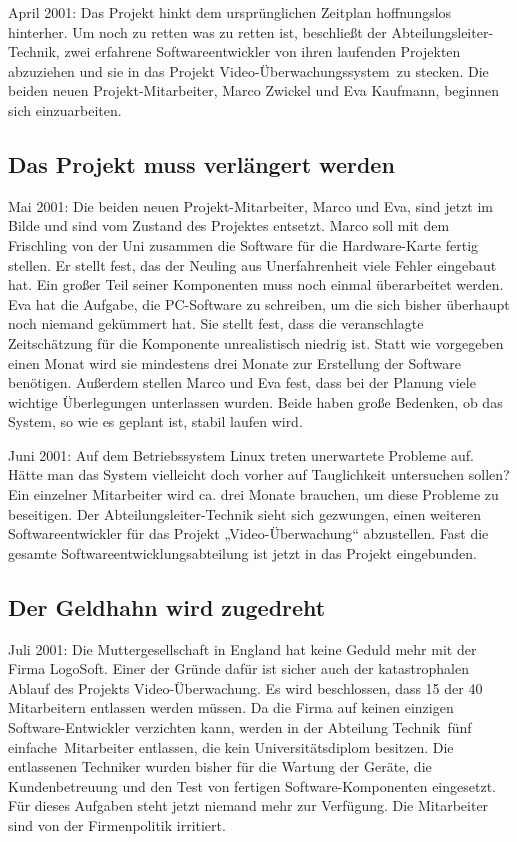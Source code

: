 April 2001: Das Projekt hinkt dem ursprünglichen Zeitplan hoffnungslos
hinterher. Um noch zu retten was zu retten ist, beschließt der
Abteilungsleiter-Technik, zwei erfahrene Softwareentwickler von ihren laufenden
Projekten abzuziehen und sie in das Projekt \glqq Video-Überwachungssystem\grqq\
zu stecken. Die beiden neuen Projekt-Mitarbeiter, Marco Zwickel und Eva
Kaufmann, beginnen sich einzuarbeiten.


\subsection{Das Projekt muss verlängert werden}

Mai 2001: Die beiden neuen Projekt-Mitarbeiter, Marco und Eva, sind jetzt im
Bilde und sind vom Zustand des Projektes entsetzt. Marco soll mit dem
Frischling von der Uni zusammen die Software für die Hardware-Karte fertig
stellen. Er stellt fest, das der Neuling aus Unerfahrenheit viele Fehler
eingebaut hat. Ein großer Teil seiner Komponenten muss noch einmal überarbeitet
werden. Eva hat die Aufgabe, die PC-Software zu schreiben, um die sich bisher
überhaupt noch niemand gekümmert hat. Sie stellt fest, dass die veranschlagte
Zeitschätzung für die Komponente unrealistisch niedrig ist. Statt wie
vorgegeben einen Monat wird sie mindestens drei Monate zur Erstellung der
Software benötigen. Außerdem stellen Marco und Eva fest, dass bei der Planung
viele wichtige Überlegungen unterlassen wurden. Beide haben große Bedenken, ob
das System, so wie es geplant ist, stabil laufen wird.

Juni 2001: Auf dem Betriebssystem Linux treten unerwartete Probleme auf. Hätte
man das System vielleicht doch vorher auf Tauglichkeit untersuchen sollen? Ein
einzelner Mitarbeiter wird ca. drei Monate brauchen, um diese Probleme zu
beseitigen. Der Abteilungsleiter-Technik sieht sich gezwungen, einen weiteren
Softwareentwickler für das Projekt „Video-Überwachung“ abzustellen. Fast die
gesamte Softwareentwicklungsabteilung ist jetzt in das Projekt eingebunden.


\subsection{Der Geldhahn wird zugedreht}

Juli 2001: Die Muttergesellschaft in England hat keine Geduld mehr mit der
Firma LogoSoft. Einer der Gründe dafür ist sicher auch der katastrophalen
Ablauf des Projekts Video-Überwachung. Es wird beschlossen, dass 15 der 40
Mitarbeitern entlassen werden müssen. Da die Firma auf keinen einzigen
Software-Entwickler verzichten kann, werden in der Abteilung \glqq Technik\grqq\
fünf \glqq einfache\grqq\ Mitarbeiter entlassen, die kein Universitätsdiplom
besitzen. Die entlassenen Techniker wurden bisher für die Wartung der Geräte,
die Kundenbetreuung und den Test von fertigen Software-Komponenten eingesetzt.
Für dieses Aufgaben steht jetzt niemand mehr zur Verfügung. Die Mitarbeiter
sind von der Firmenpolitik irritiert.


